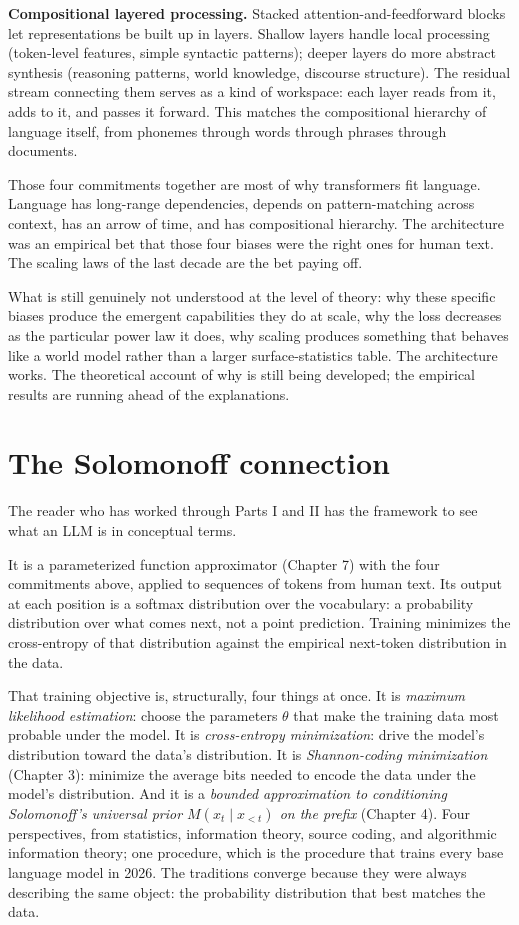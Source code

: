 \textbf{Compositional layered processing.} Stacked attention-and-feedforward blocks let representations be built up in layers. Shallow layers handle local processing (token-level features, simple syntactic patterns); deeper layers do more abstract synthesis (reasoning patterns, world knowledge, discourse structure). The residual stream connecting them serves as a kind of workspace: each layer reads from it, adds to it, and passes it forward. This matches the compositional hierarchy of language itself, from phonemes through words through phrases through documents.

Those four commitments together are most of why transformers fit language. Language has long-range dependencies, depends on pattern-matching across context, has an arrow of time, and has compositional hierarchy. The architecture was an empirical bet that those four biases were the right ones for human text. The scaling laws of the last decade are the bet paying off.

What is still genuinely not understood at the level of theory: why these specific biases produce the emergent capabilities they do at scale, why the loss decreases as the particular power law it does, why scaling produces something that behaves like a world model rather than a larger surface-statistics table. The architecture works. The theoretical account of why is still being developed; the empirical results are running ahead of the explanations.

\section*{The Solomonoff connection}

The reader who has worked through Parts I and II has the framework to see what an LLM is in conceptual terms.

It is a parameterized function approximator (Chapter 7) with the four commitments above, applied to sequences of tokens from human text. Its output at each position is a softmax distribution over the vocabulary: a probability distribution over what comes next, not a point prediction. Training minimizes the cross-entropy of that distribution against the empirical next-token distribution in the data.

That training objective is, structurally, four things at once. It is \emph{maximum likelihood estimation}: choose the parameters $\theta$ that make the training data most probable under the model. It is \emph{cross-entropy minimization}: drive the model's distribution toward the data's distribution. It is \emph{Shannon-coding minimization} (Chapter 3): minimize the average bits needed to encode the data under the model's distribution. And it is a \emph{bounded approximation to conditioning Solomonoff's universal prior $M(x_t \mid x_{<t})$ on the prefix} (Chapter 4). Four perspectives, from statistics, information theory, source coding, and algorithmic information theory; one procedure, which is the procedure that trains every base language model in 2026. The traditions converge because they were always describing the same object: the probability distribution that best matches the data.

